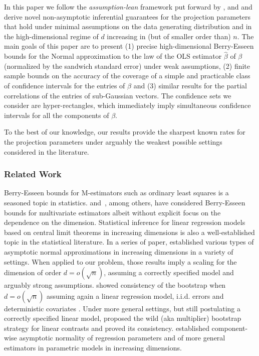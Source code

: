 \documentclass[11pt]{article}
\let\hat\widehat
\begin{document}
In this paper we follow the {\it assumption-lean} framework put forward by \cite{Buja14}, \cite{kuchibhotla2018valid} and \cite{boot} and derive novel non-asymptotic inferential guarantees for the projection parameters that hold under minimal assumptions on the data generating distribution and in the high-dimensional regime of $d$ increasing in (but of smaller order than) $n$.
The main goals of this paper are to present (1) precise high-dimensional Berry-Esseen bounds 
for the Normal approximation to the law of
the OLS estimator
$\hat\beta$ of $\beta$ (normalized by the sandwich standard error) under weak assumptions,
(2) finite sample bounds on the
accuracy of the coverage of a simple and practicable class of confidence intervals for the entries of
 $\beta$
and
(3) similar results for the 
partial correlations of the entries of sub-Gaussian vectors.
The confidence sets we consider are
hyper-rectangles, which
immediately imply
simultaneous
confidence intervals
for all the components of $\beta$.

To the best of our knowledge, our results provide the sharpest known rates for the projection parameters under arguably the weakest possible settings considered in the  literature. 


\subsubsection*{Related Work}
Berry-Esseen bounds for M-estimators such as ordinary least squares is a seasoned topic in statistics. \cite{pfanzagl1973accuracy} and~\cite{paulauskas1996rates}, among others, have considered Berry-Esseen bounds for multivariate estimators albeit without explicit focus on the dependence on the dimension. 
Statistical inference for linear regression models based on central limit theorems in increasing dimensions is also a well-established topic in the statistical literature. 
In a series of paper, \cite{Portnoy84,Portnoy85,Portnoy86,Portnoy88} established 
various types of asymptotic normal approximations in increasing dimensions in a variety of settings. When applied to our problem, those results imply a scaling for the dimension of order $d = o(\sqrt{n})$, assuming a correctly specified model and arguably strong assumptions.
\cite{bickel1983bootstrapping}
showed  consistency of the bootstrap
when $d=o(\sqrt{n})$ assuming again a linear regression model, i.i.d. errors and deterministic covariates \cite[see also][]{mammen1989}. Under more general settings, but still postulating a correctly specified linear model, \cite{mammen1993} proposed the wild (aka multiplier) bootstrap strategy \citep[see also][]{liu1988} for linear contrasts and proved its consistency. \cite{He2000} \citep[see also][]{welsh1989} established component-wise asymptotic normality of regression parameters and of more general estimators in parametric models in increasing dimensions. 
\end{document}
